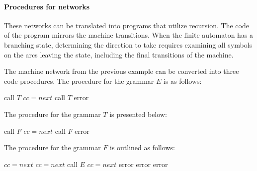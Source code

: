 \paragraph*{Procedures for networks}
These networks can be translated into programs that utilize recursion. 
The code of the program mirrors the machine transitions. 
When the finite automaton has a branching state, determining the direction to take requires examining all symbols on the arcs leaving the state, including the final transitions of the machine.
\begin{example}
    The machine network from the previous example can be converted into three code procedures. 
    The procedure for the grammar $E$ is as follows:
    \begin{algorithmic}[1]
        \State call $T$
            \State $cc=next$
            \State call $T$
        \EndWhile
            \State \Return
        \Else 
            \State error
        \EndIf
    \end{algorithmic}
    The procedure for the grammar $T$ is presented below:
    \begin{algorithmic}[1]
        \State call $F$
            \State $cc=next$
            \State call $F$
        \EndWhile
            \State \Return
        \Else 
            \State error
        \EndIf
    \end{algorithmic}
    The procedure for the grammar $F$ is outlined as follows:
    \begin{algorithmic}[1]
            \State $cc=next$
            \State $cc=next$
            \State call $E$
                \State $cc=next$
                    \State \Return
                \Else 
                    \State error
                \EndIf
            \Else 
                \State error
            \EndIf
        \Else 
            \State error
        \EndIf
    \end{algorithmic}
\end{example}